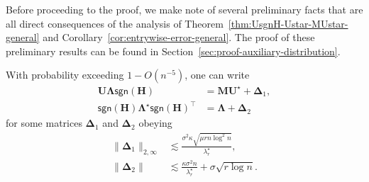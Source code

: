 Before proceeding to the proof, we make note of several preliminary facts that are all direct consequences of the analysis of Theorem~\ref{thm:UsgnH-Ustar-MUstar-general} and Corollary~\ref{cor:entrywise-error-general}. The proof of these preliminary results can be found in Section~\ref{sec:proof-auxiliary-distribution}.
%
\begin{lemma}
\label{lem:bound-Delta1-Delta2}
%
With probability exceeding $1-O(n^{-5})$, one can write
%
\begin{subequations}\label{eq:decomp_soda}
\begin{align}
\bm{U}\bm{\Lambda}\mathsf{sgn}(\bm{H}) & =\bm{M}\bm{U}^{\star}+\bm{\Delta}_{1} ,
			\label{eq:U-Lambda-sgnH-decompose}\\
\mathsf{sgn}(\bm{H})\bm{\Lambda}^{\star}\mathsf{sgn}(\bm{H})^{\top} & =\bm{\Lambda}+\bm{\Delta}_{2}
			\label{eq:sgnH-Lambdastar-decompose}
\end{align}
\end{subequations}
%
for some matrices $\bm{\Delta}_{1}$ and $\bm{\Delta}_{2}$ obeying
%
\begin{subequations}
\begin{align}
  \big\| \bm{\Delta}_1 \big\|_{2,\infty} & \lesssim 
\frac{\sigma^{2}\kappa\sqrt{\mu rn\log^{2}n}}{\lambda_{r}^{\star}}, \label{eq:Delta-1-U-R-Lambda}\\
  \big\|\bm{\Delta}_2\big\|
  &\lesssim\frac{\kappa\sigma^{2}n}{\lambda_{r}^{\star}}+\sigma\sqrt{r\log n}.
   \label{eq:sgn-H-Lambdastar-sgn-H-Lambda}
\end{align}
\end{subequations}
%
\end{lemma}
%




